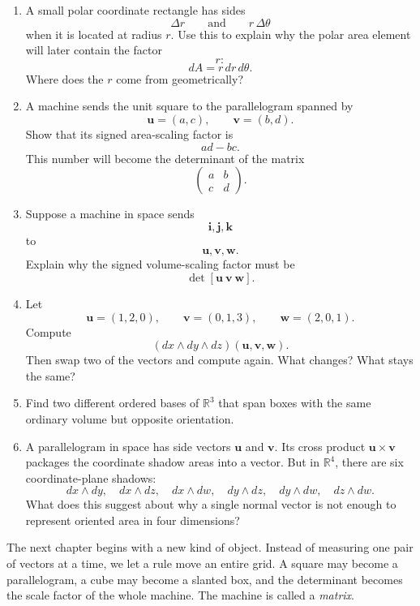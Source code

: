\begin{enumerate}
\item A small polar coordinate rectangle has sides
\[
    \Delta r
    \qquad\text{and}\qquad
    r\,\Delta\theta
\]
when it is located at radius \(r\).  Use this to explain why the polar area element will
later contain the factor
\[
    r:
\]
\[
    dA=r\,dr\,d\theta.
\]
Where does the \(r\) come from geometrically?

\item A machine sends the unit square to the parallelogram spanned by
\[
    \mathbf u=(a,c),
    \qquad
    \mathbf v=(b,d).
\]
Show that its signed area-scaling factor is
\[
    ad-bc.
\]
This number will become the determinant of the matrix
\[
    \begin{pmatrix}
    a&b\\
    c&d
    \end{pmatrix}.
\]

\item Suppose a machine in space sends
\[
    \mathbf i,\mathbf j,\mathbf k
\]
to
\[
    \mathbf u,\mathbf v,\mathbf w.
\]
Explain why the signed volume-scaling factor must be
\[
    \det[\mathbf u\ \mathbf v\ \mathbf w].
\]

\item Let
\[
    \mathbf u=(1,2,0),
    \qquad
    \mathbf v=(0,1,3),
    \qquad
    \mathbf w=(2,0,1).
\]
Compute
\[
    (dx\wedge dy\wedge dz)(\mathbf u,\mathbf v,\mathbf w).
\]
Then swap two of the vectors and compute again.  What changes?  What stays the same?

\item Find two different ordered bases of \(\mathbb R^3\) that span boxes with the same
ordinary volume but opposite orientation.

\item A parallelogram in space has side vectors \(\mathbf u\) and \(\mathbf v\).  Its
cross product \(\mathbf u\times\mathbf v\) packages the coordinate shadow areas into
a vector.  But in \(\mathbb R^4\), there are six coordinate-plane shadows:
\[
    dx\wedge dy,\quad dx\wedge dz,\quad dx\wedge dw,\quad
    dy\wedge dz,\quad dy\wedge dw,\quad dz\wedge dw.
\]
What does this suggest about why a single normal vector is not enough to represent
oriented area in four dimensions?
\end{enumerate}

The next chapter begins with a new kind of object.  Instead of measuring one pair of
vectors at a time, we let a rule move an entire grid.  A square may become a
parallelogram, a cube may become a slanted box, and the determinant becomes the
scale factor of the whole machine.  The machine is called a \emph{matrix}.